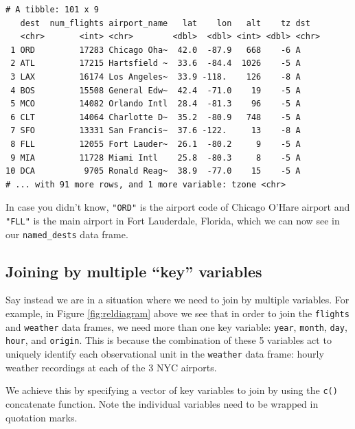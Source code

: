 \documentclass[12pt,]{krantz}
\makeatletter
\newenvironment{Shaded}{\begin{snugshade}}{\end{snugshade}}
\newcommand{\KeywordTok}[1]{\textcolor[rgb]{0.27,0.27,0.27}{\textbf{#1}}}
\newcommand{\DataTypeTok}[1]{\textcolor[rgb]{0.27,0.27,0.27}{#1}}
\newcommand{\StringTok}[1]{\textcolor[rgb]{0.5,0.5,0.5}{#1}}
\newcommand{\OperatorTok}[1]{\textcolor[rgb]{0.43,0.43,0.43}{\textbf{#1}}}
\newcommand{\NormalTok}[1]{#1}
\newenvironment{kframe}{%
\medskip{}
\setlength{\fboxsep}{.8em}
 \def\at@end@of@kframe{}%
 \ifinner\ifhmode%
  \def\at@end@of@kframe{\end{minipage}}%
  \begin{minipage}{\columnwidth}%
 \fi\fi%
 \def\FrameCommand##1{\hskip\@totalleftmargin \hskip-\fboxsep
 \colorbox{shadecolor}{##1}\hskip-\fboxsep
     \hskip-\linewidth \hskip-\@totalleftmargin \hskip\columnwidth}%
 \MakeFramed {\advance\hsize-\width
   \@totalleftmargin\z@ \linewidth\hsize
   \@setminipage}}%
 {\par\unskip\endMakeFramed%
 \at@end@of@kframe}
\renewenvironment{Shaded}{\begin{kframe}}{\end{kframe}}
\theoremstyle{definition}
\theoremstyle{definition}
\theoremstyle{definition}
\theoremstyle{remark}
\makeatother
\begin{document}
\begin{verbatim}
# A tibble: 101 x 9
   dest  num_flights airport_name   lat    lon   alt    tz dst  
   <chr>       <int> <chr>        <dbl>  <dbl> <int> <dbl> <chr>
 1 ORD         17283 Chicago Oha~  42.0  -87.9   668    -6 A    
 2 ATL         17215 Hartsfield ~  33.6  -84.4  1026    -5 A    
 3 LAX         16174 Los Angeles~  33.9 -118.    126    -8 A    
 4 BOS         15508 General Edw~  42.4  -71.0    19    -5 A    
 5 MCO         14082 Orlando Intl  28.4  -81.3    96    -5 A    
 6 CLT         14064 Charlotte D~  35.2  -80.9   748    -5 A    
 7 SFO         13331 San Francis~  37.6 -122.     13    -8 A    
 8 FLL         12055 Fort Lauder~  26.1  -80.2     9    -5 A    
 9 MIA         11728 Miami Intl    25.8  -80.3     8    -5 A    
10 DCA          9705 Ronald Reag~  38.9  -77.0    15    -5 A    
# ... with 91 more rows, and 1 more variable: tzone <chr>
\end{verbatim}

In case you didn't know, \texttt{"ORD"} is the airport code of Chicago
O'Hare airport and \texttt{"FLL"} is the main airport in Fort
Lauderdale, Florida, which we can now see in our \texttt{named\_dests}
data frame.

\subsection{\texorpdfstring{Joining by multiple ``key''
variables}{Joining by multiple key variables}}\label{joining-by-multiple-key-variables}

Say instead we are in a situation where we need to join by multiple
variables. For example, in Figure \ref{fig:reldiagram} above we see that
in order to join the \texttt{flights} and \texttt{weather} data frames,
we need more than one key variable: \texttt{year}, \texttt{month},
\texttt{day}, \texttt{hour}, and \texttt{origin}. This is because the
combination of these 5 variables act to uniquely identify each
observational unit in the \texttt{weather} data frame: hourly weather
recordings at each of the 3 NYC airports.

We achieve this by specifying a vector of key variables to join by using
the \texttt{c()} concatenate function. Note the individual variables
need to be wrapped in quotation marks.

\begin{Shaded}
\end{Shaded}
\end{document}
